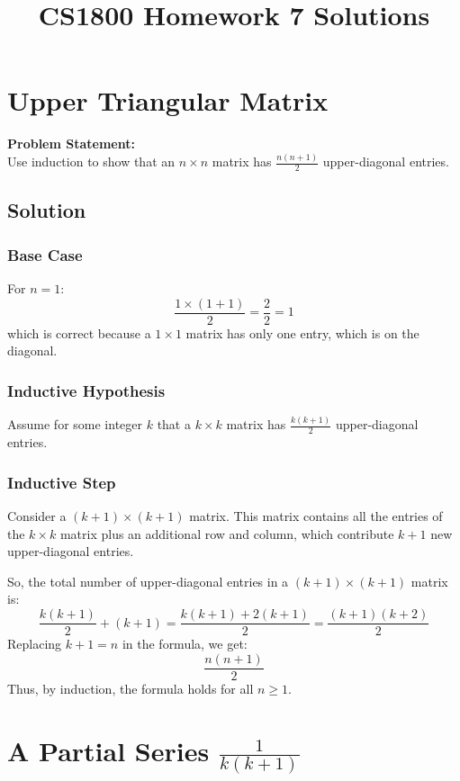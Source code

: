 \documentclass[10pt]{article}
\title{CS1800 Homework 7 Solutions}
\author{}
\date{}
\begin{document}
\maketitle
\newpage

\section{Upper Triangular Matrix}

\textbf{Problem Statement:} \\
Use induction to show that an \( n \times n \) matrix has \( \frac{n(n+1)}{2} \) upper-diagonal entries.

\subsection{Solution}

\subsubsection{Base Case}

For \( n = 1 \):
\[
\frac{1 \times (1 + 1)}{2} = \frac{2}{2} = 1
\]
which is correct because a \( 1 \times 1 \) matrix has only one entry, which is on the diagonal.

\subsubsection{Inductive Hypothesis}

Assume for some integer \( k \) that a \( k \times k \) matrix has \( \frac{k(k+1)}{2} \) upper-diagonal entries.

\subsubsection{Inductive Step}

Consider a \( (k+1) \times (k+1) \) matrix. This matrix contains all the entries of the \( k \times k \) matrix plus an additional row and column, which contribute \( k + 1 \) new upper-diagonal entries.

So, the total number of upper-diagonal entries in a \( (k+1) \times (k+1) \) matrix is:
\[
\frac{k(k+1)}{2} + (k + 1) = \frac{k(k+1) + 2(k+1)}{2} = \frac{(k+1)(k+2)}{2}
\]
Replacing \( k+1 = n \) in the formula, we get:
\[
\frac{n(n+1)}{2}
\]
Thus, by induction, the formula holds for all \( n \geq 1 \).

\newpage

\section{A Partial Series \(\frac{1}{k(k+1)}\)}
\end{document}
